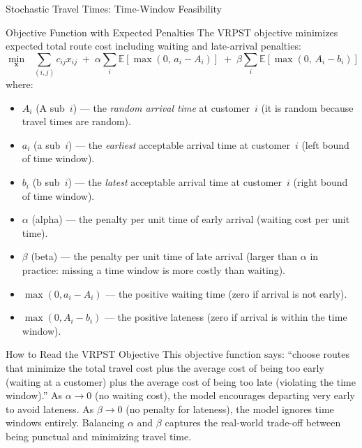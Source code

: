 \documentclass[aspectratio=169,10pt]{beamer}
\begin{document}
\begin{frame}[allowframebreaks]{Stochastic Travel Times: Time-Window Feasibility}
  \framebreak

  \begin{block}{Objective Function with Expected Penalties}
    The VRPST objective minimizes expected total route cost including
    waiting and late-arrival penalties:
    \[
      \min_{\mathbf{x}} \;\; \sum_{(i,j)} c_{ij} x_{ij}
      \;+\; \alpha \sum_i \mathbb{E}[\max(0,\, a_i - A_i)]
      \;+\; \beta  \sum_i \mathbb{E}[\max(0,\, A_i - b_i)]
    \]
    where:
    \begin{itemize}
      \item $A_i$ (A sub~$i$) --- the \emph{random arrival time} at
            customer~$i$ (it is random because travel times are random).
      \item $a_i$ (a sub~$i$) --- the \emph{earliest} acceptable arrival
            time at customer~$i$ (left bound of time window).
      \item $b_i$ (b sub~$i$) --- the \emph{latest} acceptable arrival
            time at customer~$i$ (right bound of time window).
      \item $\alpha$ (alpha) --- the penalty per unit time of early
            arrival (waiting cost per unit time).
      \item $\beta$ (beta) --- the penalty per unit time of late arrival
            (larger than $\alpha$ in practice: missing a time window is
            more costly than waiting).
      \item $\max(0, a_i - A_i)$ --- the positive waiting time
            (zero if arrival is not early).
      \item $\max(0, A_i - b_i)$ --- the positive lateness
            (zero if arrival is within the time window).
    \end{itemize}
  \end{block}

  \framebreak

  \begin{alertblock}{How to Read the VRPST Objective}
    This objective function says: ``choose routes that minimize the total
    travel cost plus the average cost of being too early (waiting at a
    customer) plus the average cost of being too late (violating the time
    window).''
    As $\alpha \to 0$ (no waiting cost), the model encourages departing
    very early to avoid lateness.
    As $\beta \to 0$ (no penalty for lateness), the model ignores time
    windows entirely.
    Balancing $\alpha$ and $\beta$ captures the real-world trade-off
    between being punctual and minimizing travel time.
  \end{alertblock}


\end{frame}
\end{document}

